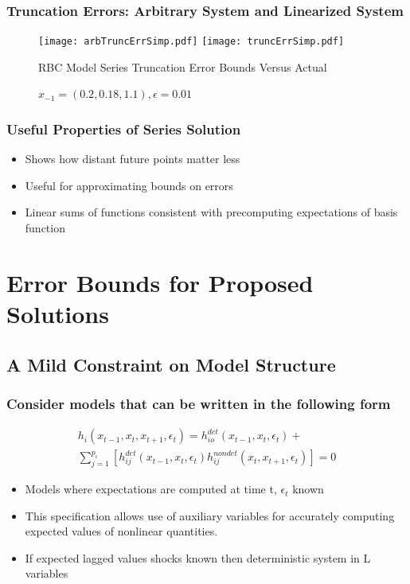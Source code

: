 \documentclass[tikz]{beamer}
\begin{document}
  \begin{frame}
    \frametitle{Truncation Errors: Arbitrary System and Linearized System}


\begin{figure}[H]
  \centering
\texttt{[image: arbTruncErrSimp.pdf]}  
\texttt{[image: truncErrSimp.pdf]}  
\caption{RBC Model Series Truncation Error Bounds Versus Actual}
  \caption{ $x_{-1}=( {{0.2}, {0.18}, {1.1}}), \epsilon=0.01$} \label{arbFig}
\end{figure}


  \end{frame}


\begin{frame}
\frametitle{Useful Properties of Series Solution}

\begin{itemize}
\item Shows how distant future  points matter less 
\item Useful for  approximating bounds on errors
\item Linear sums of functions consistent with precomputing expectations of basis function
\end{itemize}



\end{frame}




\section{Error Bounds for Proposed Solutions}





\subsection{A Mild Constraint on Model Structure}



\begin{frame}
\frametitle{Consider  models that can be written in  the following form}


\begin{gather}
  h_i(x_{t-1},x_{t},x_{t+1},\epsilon_t)=h^{det}_{io}(x_{t-1},x_{t},\epsilon_t)+\\ \sum_{j=1}^{p_i} [h^{det}_{ij}(x_{t-1},x_{t},\epsilon_t)h^{nondet}_{ij}(x_{t},x_{t+1},\epsilon_t)]=0
\end{gather}

\begin{itemize}
\item Models where expectations are computed at time t, $\epsilon_t$  known
\item This specification allows use of auxiliary variables for 
accurately computing expected values of nonlinear quantities.
\item If expected lagged values shocks known then deterministic system in L variables
\end{itemize}

\end{frame}
\end{document}
